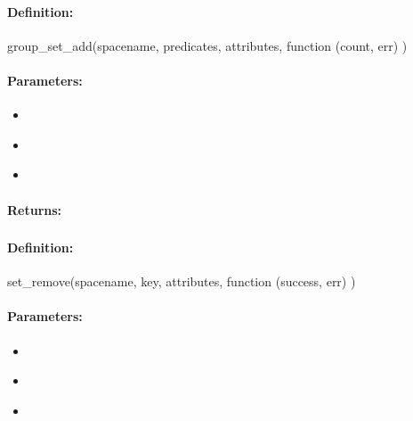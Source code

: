 \paragraph{Definition:}
\begin{javascriptcode}
group_set_add(spacename, predicates, attributes, function (count, err) {})
\end{javascriptcode}
\paragraph{Parameters:}
\begin{itemize}[noitemsep]
\item {}\\

\item {}\\

\item {}\\

\end{itemize}

\paragraph{Returns:}


\pagebreak
\subsubsection{}
\label{api:nodejs:set_remove}


\paragraph{Definition:}
\begin{javascriptcode}
set_remove(spacename, key, attributes, function (success, err) {})
\end{javascriptcode}
\paragraph{Parameters:}
\begin{itemize}[noitemsep]
\item {}\\

\item {}\\

\item {}\\

\end{itemize}

